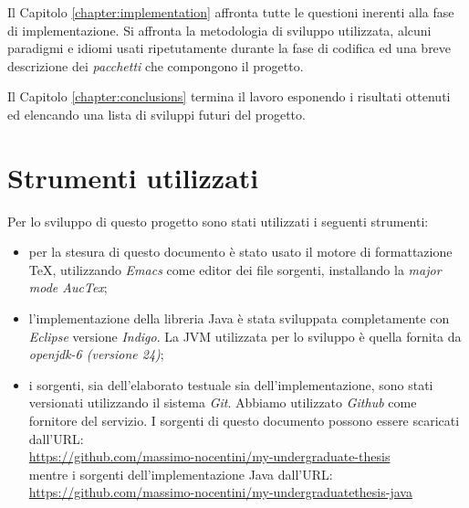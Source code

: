 Il Capitolo \ref{chapter:implementation} affronta tutte le questioni
inerenti alla fase di implementazione. Si affronta la metodologia di
sviluppo utilizzata, alcuni paradigmi e idiomi usati ripetutamente
durante la fase di codifica ed una breve descrizione dei
\emph{pacchetti} che compongono il progetto.

Il Capitolo \ref{chapter:conclusions} termina il lavoro esponendo i
risultati ottenuti ed elencando una lista di sviluppi futuri del
progetto.

\section{Strumenti utilizzati}
Per lo sviluppo di questo progetto sono stati utilizzati i seguenti
strumenti:
\begin{itemize}
\item per la stesura di questo documento \`e stato usato il motore di
  formattazione \TeX, utilizzando \emph{Emacs} come editor dei file
  sorgenti, installando la \emph{major mode AucTex};
\item l'implementazione della libreria Java \`e stata sviluppata
  completamente con \emph{Eclipse} versione \emph{Indigo}. La JVM
  utilizzata per lo sviluppo \`e quella fornita da \emph{openjdk-6
    (versione 24)};
\item i sorgenti, sia dell'elaborato testuale sia
  dell'implementazione, sono stati versionati utilizzando il sistema
  \emph{Git}. Abbiamo utilizzato \emph{Github} come fornitore del
  servizio. I sorgenti di questo documento possono essere scaricati
  dall'URL:\\
  \href{https://github.com/massimo-nocentini/my-undergraduate-thesis}{
    https://github.com/massimo-nocentini/my-undergraduate-thesis}\\
  mentre i sorgenti dell'implementazione Java dall'URL:\\
  \href{https://github.com/massimo-nocentini/my-undergraduatethesis-java}{
    https://github.com/massimo-nocentini/my-undergraduatethesis-java}
\end{itemize}
